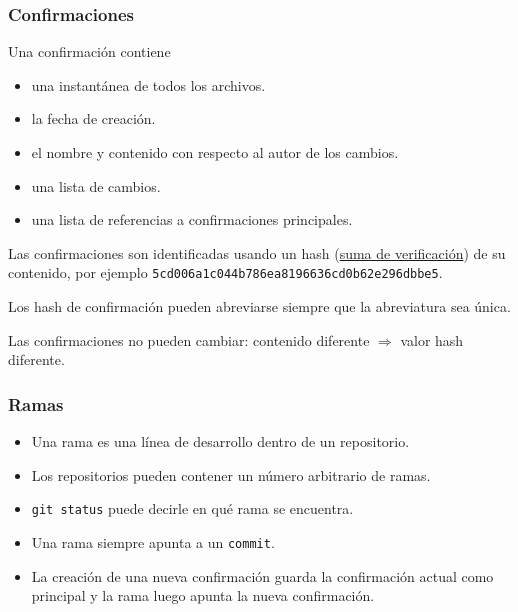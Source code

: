 \begin{frame}[fragile]
	\frametitle{Confirmaciones
		🔖}

	Una confirmación contiene
	\begin{itemize}
		\item una instantánea de todos los archivos.
		\item la fecha de creación.
		\item el nombre y contenido con respecto al autor de los cambios.
		\item una lista de cambios.
		\item una lista de referencias a confirmaciones principales.
	\end{itemize}

	Las confirmaciones son identificadas usando un hash
	(\href{https://es.wikipedia.org/wiki/Suma_de_verificaci%C3%B3n}{suma de verificación}) de su contenido, por ejemplo
	\lstinline|5cd006a1c044b786ea8196636cd0b62e296dbbe5|.

	Los hash de confirmación pueden abreviarse siempre que la abreviatura
	sea única.

	Las confirmaciones no pueden cambiar: contenido diferente
	$\Rightarrow$ valor hash diferente.

\end{frame}

\begin{frame}
	\frametitle{Ramas 🌲}

	\begin{itemize}
		\item Una rama es una línea de desarrollo dentro de un
		      repositorio.
		\item Los repositorios pueden contener un número arbitrario de
		      ramas.
		\item \lstinline|git status| puede decirle en qué rama
		      se encuentra.
		\item Una rama siempre apunta a un \lstinline|commit|.
		\item La creación de una nueva confirmación guarda la
		      confirmación actual como principal y la rama luego apunta
		      la nueva confirmación.
	\end{itemize}

\end{frame}

